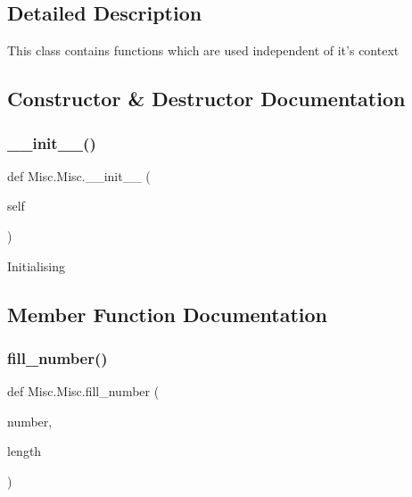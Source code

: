 \subsection{Detailed Description}
\begin{DoxyVerb}This class contains functions which are used independent of it's context
\end{DoxyVerb}
 

\subsection{Constructor \& Destructor Documentation}
\mbox{\label{class_misc_1_1_misc_a2361f15b11e4875dff86f4bedf58dc31}} 
\subsubsection{\texorpdfstring{\+\_\+\+\_\+init\+\_\+\+\_\+()}{\_\_init\_\_()}}
{\footnotesize\ttfamily def Misc.\+Misc.\+\_\+\+\_\+init\+\_\+\+\_\+ (\begin{DoxyParamCaption}\item[{}]{self }\end{DoxyParamCaption})}

\begin{DoxyVerb}Initialising
\end{DoxyVerb}
 

\subsection{Member Function Documentation}
\mbox{\label{class_misc_1_1_misc_a58fba0bed4c5f2ff76cdf83e20670fb4}} 
\subsubsection{\texorpdfstring{fill\+\_\+number()}{fill\_number()}}
{\footnotesize\ttfamily def Misc.\+Misc.\+fill\+\_\+number (\begin{DoxyParamCaption}\item[{}]{number,  }\item[{}]{length }\end{DoxyParamCaption})\hspace{0.3cm}{\ttfamily [static]}}

